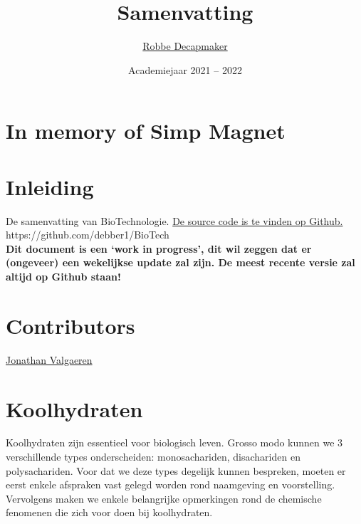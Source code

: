 \documentclass[a4paper,kul]{kulakarticle} %
\date{Academiejaar 2021 -- 2022}
\title{Samenvatting}
\author{\href{https://github.com/debber1}{Robbe Decapmaker}}
\begin{document}
\maketitle
\section*{In memory of Simp Magnet}
\section*{Inleiding}

De samenvatting van BioTechnologie. \href{https://github.com/debber1/BioTech}{De source code is te vinden op Github.}\\
https://github.com/debber1/BioTech\\
\textbf{Dit document is een `work in progress', dit wil zeggen dat er (ongeveer) een wekelijkse update zal zijn. De meest recente versie zal altijd op Github staan!}
\section*{Contributors}
\href{https://github.com/ItsAlphie}{Jonathan Valgaeren}
\tableofcontents
\newpage
\section{Koolhydraten}
Koolhydraten zijn essentieel voor biologisch leven. Grosso modo kunnen we 3 verschillende types onderscheiden: monosachariden, disachariden en polysachariden. Voor dat we deze types degelijk kunnen bespreken, moeten er eerst enkele afspraken vast gelegd worden rond naamgeving en voorstelling. Vervolgens maken we enkele belangrijke opmerkingen rond de chemische fenomenen die zich voor doen bij koolhydraten. 
\end{document}

